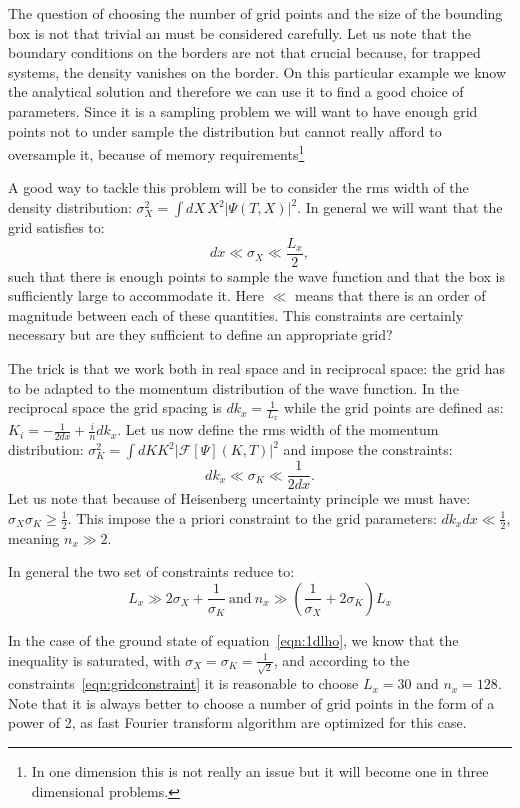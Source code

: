 \documentclass[12pt,a4paper]{report}
\newcommand{\abs}[1]{\left|#1\right|}
\newcommand{\fft}[1]{\mathcal{F}\left[#1\right]}
\begin{document}
The question of choosing the number of grid points and the size of the bounding box is not that trivial an must be considered carefully.
Let us note that the boundary conditions on the borders are not that crucial because, for trapped systems, the density vanishes on the border.
On this particular example we know the analytical solution and therefore we can use it to find a good choice of parameters.
Since it is a sampling problem we will want to have enough grid points not to under sample the distribution but cannot really afford to oversample it, because of memory requirements\footnote{In one dimension this is not really an issue but it will become one in three dimensional problems.}

A good way to tackle this problem will be to consider the rms width of the density distribution: $\sigma_X^2=\int dX\,X^2\abs{\Psi(T,X)}^2$.
In general we will want that the grid satisfies to:
\begin{equation}
dx\ll\sigma_X\ll\frac{L_x}{2},
\end{equation}
such that there is enough points to sample the wave function and that the box is sufficiently large to accommodate it.
Here $\ll$ means that there is an order of magnitude between each of these quantities.
This constraints are certainly necessary but are they sufficient to define an appropriate grid?

The trick is that we work both in real space and in reciprocal space: the grid has to be adapted to the momentum distribution of the wave function.
In the reciprocal space the grid spacing is $dk_x=\frac{1}{L_x}$ while the grid points are defined as: $K_i=-\frac{1}{2dx}+\frac{i}{n}dk_x$.
Let us now define the rms width of the momentum distribution: $\sigma_K^2=\int dK K^2\abs{\fft{\Psi}(K,T)}^2$ and impose the constraints:
\begin{equation}
dk_x\ll\sigma_K\ll\frac{1}{2dx}.
\end{equation}
Let us note that because of Heisenberg uncertainty principle we must have: $\sigma_X\sigma_K\geq\frac{1}{2}$. This impose the a priori constraint to the grid parameters: $dk_x dx\ll\frac{1}{2}$, meaning $n_x\gg2$.

In general the two set of constraints reduce to:
\begin{equation}
L_x\gg2\sigma_X+\frac{1}{\sigma_K}
~\textrm{and}~
n_x\gg\left(\frac{1}{\sigma_X}+2\sigma_K\right)L_x
\label{eqn:gridconstraint}
\end{equation}

In the case of the ground state of equation~\eqref{eqn:1dlho}, we know that the inequality is saturated, with $\sigma_X=\sigma_K=\frac{1}{\sqrt{2}}$, and according to the constraints~\eqref{eqn:gridconstraint} it is reasonable to choose $L_x=30$ and $n_x=128$.
Note that it is always better to choose a number of grid points in the form of a power of 2, as fast Fourier transform algorithm are optimized for this case.
\end{document}
